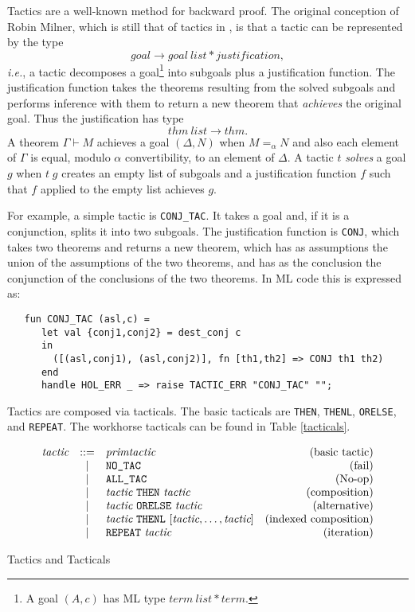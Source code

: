 \documentclass[12pt,fleqn,layout,a4paper]{report}
\newcommand{\tactic}      {\mbox{\it tactic}}
\newcommand{\primtactic}      {\mbox{\it primtactic}}
\begin{document}
Tactics are a well-known method for backward proof. The original
conception of Robin Milner, which is still that of tactics in
\HOL, is that a tactic can be represented by the type
\[ goal \longrightarrow goal\ list * justification, \]
{\it i.e.}, a tactic decomposes a goal\footnote{A goal $(A,c)$ has ML
type $term\ list * term$.} into subgoals plus a
justification function. The justification function takes the theorems
resulting from the solved subgoals and performs inference with them to
return a new theorem that {\it achieves} the original goal. Thus the
justification has type
 \[  thm\ list \longrightarrow thm.  \]
 A theorem $\Gamma \vdash M$ achieves a goal $(\Delta,N)$ when $M =_\alpha
 N$ and also each element of $\Gamma$ is equal, modulo $\alpha$
 convertibility, to an element of $\Delta$. A tactic $t$ {\it solves\/} a
 goal $g$ when $t\; g$ creates an empty list of subgoals and a
 justification function $f$ such that $f$ applied to the empty list
 achieves $g$.

For example, a simple tactic is \verb+CONJ_TAC+. It takes a goal and, if
it is a conjunction, splits it into two subgoals. The justification
function is \verb+CONJ+, which takes two theorems and returns a new
theorem, which has as assumptions the union of the assumptions of the
two theorems, and has as the conclusion the conjunction of the
conclusions of the two theorems. In ML code this is expressed as:

\begin{verbatim}
   fun CONJ_TAC (asl,c) =
      let val {conj1,conj2} = dest_conj c
      in
        ([(asl,conj1), (asl,conj2)], fn [th1,th2] => CONJ th1 th2)
      end
      handle HOL_ERR _ => raise TACTIC_ERR "CONJ_TAC" "";
\end{verbatim}

Tactics are composed via tacticals. The basic tacticals are \verb+THEN+,
\verb+THENL+, \verb+ORELSE+, and \verb+REPEAT+. The workhorse tacticals
can be found in Table \ref{tacticals}.

\begin{table}
\[
\begin{array}{rclr}
 \tactic & ::= & \primtactic & \mbox{(basic tactic)} \\
 & | & \verb+NO_TAC+ & \mbox{(fail)} \\
 & | & \verb+ALL_TAC+ & \mbox{(No-op)} \\
 & | & \tactic\ \verb+THEN+ \ \tactic & \mbox{(composition)} \\
 & | & \tactic\ \verb+ORELSE+ \ \tactic & \mbox{(alternative)} \\
 & | & \tactic\ \verb+THENL+ \ [\tactic, \ldots, \tactic] &
\mbox{(indexed composition)} \\
 & | & \verb+REPEAT+\ \tactic & \mbox{(iteration)} \\
\end{array}
\]
\caption{Tactics and Tacticals} \label{tacticals}
\end{table}
\end{document}
